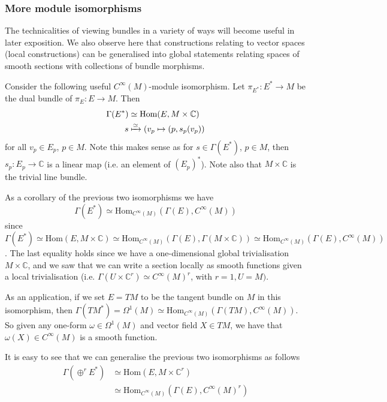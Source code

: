 \documentclass[a4paper]{article}
\theoremstyle{definition} \newtheorem*{definition}{Definition}
\theoremstyle{definition} \newtheorem*{definitions}{Definitions}
\theoremstyle{plain} \newtheorem{theorem}{Theorem}[section]
\theoremstyle{plain} \newtheorem{proposition}[theorem]{Proposition}
\theoremstyle{plain} \newtheorem{corollary}[theorem]{Corollary}
\theoremstyle{plain} \newtheorem{lemma}[theorem]{Lemma}
\theoremstyle{plain} \newtheorem{example}[theorem]{Example}
\newcommand{\complexnos}{\mathbb{C}}
\begin{document}
\subsubsection{More module isomorphisms}
The technicalities of viewing bundles in a variety of ways will become useful in later exposition. We also observe here that constructions relating to vector spaces (local constructions) can be generalised into global statements relating spaces of smooth sections with collections of bundle morphisms.

Consider the following useful $C^\infty(M)$-module isomorphism. Let $\pi_{E^\ast}:E^\ast \to M$ be the dual bundle of $\pi_E:E \to M$. Then 
\begin{align*}
\Gamma(E^\ast) & \simeq \text{Hom}(E, M\times \complexnos) \\
s & \xmapsto{\simeq} (v_p\mapsto (p, s_p(v_p))
\end{align*}
for all $v_p\in E_p$, $p\in M$. Note this makes sense as for $s\in \Gamma(E^*)$, $p\in M$, then $s_p:E_p\to \complexnos$ is a linear map (i.e. an element of $(E_p)^*$).
Note also that $M\times \complexnos$ is the trivial line bundle. 

As a corollary of the previous two isomorphisms we have 
$$\Gamma(E^\ast)\simeq \text{Hom}_{C^\infty (M)}(\Gamma(E), C^\infty (M))$$
since $\Gamma(E^\ast) \simeq \text{Hom}(E, M\times \complexnos) \simeq \text{Hom}_{C^\infty (M)}(\Gamma(E), \Gamma(M\times \complexnos))\simeq \text{Hom}_{C^\infty (M)}(\Gamma(E), C^\infty (M))$. The last equality holds since we have a one-dimensional global trivialisation $M\times \complexnos$, and we saw that we can write a section locally as smooth functions given a local trivialisation (i.e. $\Gamma(U\times \complexnos^r)\simeq C^\infty (M)^r$, with $r=1, U=M)$.

As an application, if we set $E=TM$ to be the tangent bundle on $M$ in this isomorphism, then $\Gamma(TM^*) = \Omega^1(M) \simeq \text{Hom}_{C^\infty (M)}(\Gamma(TM), C^\infty (M))$. So given any one-form $\omega\in \Omega^1(M)$ and vector field $X\in TM$, we have that $\omega(X)\in C^\infty(M)$ is a smooth function.

It is easy to see that we can generalise the previous two isomorphisms as follows
\begin{align*}
\Gamma(\oplus^r E^\ast) & \simeq \text{Hom}(E, M\times \complexnos^r) \\
 & \simeq \text{Hom}_{C^\infty (M)}(\Gamma(E), C^\infty (M)^r)
\end{align*} 
\end{document}
